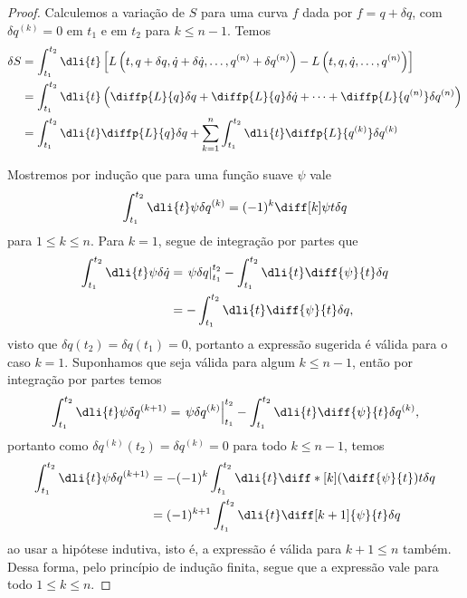 \begin{proof}
    Calculemos a variação de \(S\) para uma curva \(f\) dada por \(f = q + \delta q\), com \(\delta q^{(k)} = 0\) em \(t_1\) e em \(t_2\) para \(k \leq n-1\). Temos
    \begin{align*}
        \delta S &= \int_{t_1}^{t_2} \dli{t} \left[L\left(t, q + \delta q, \dot{q} + \delta \dot{q}, \dots, q^{(n)} + \delta q^{(n)}\right) - L\left(t, q, \dot{q}, \dots, q^{(n)}\right)\right]\\
                 &= \int_{t_1}^{t_2} \dli{t} \left( \diffp{L}{q} \delta q + \diffp{L}{q} \delta \dot{q}  + \dots + \diffp{L}{q^{(n)}}\delta q^{(n)}\right)\\
                 &= \int_{t_1}^{t_2} \dli{t} \diffp{L}{q}\delta q + \sum_{k = 1}^n \int_{t_1}^{t_2}\dli{t} \diffp{L}{q^{(k)}}\delta q^{(k)}
    \end{align*}

    Mostremos por indução que para uma função suave \(\psi\) vale
    \begin{equation*}
        \int_{t_1}^{t_2} \dli{t} \psi \delta q^{(k)} = (-1)^k\diff[k]\psi{t} \delta q
    \end{equation*}
    para \(1 \leq k \leq n\). Para \(k = 1\), segue de integração por partes que
    \begin{align*}
        \int_{t_1}^{t_2} \dli{t} \psi \delta \dot{q} &= \left.\psi\delta q\right\rvert_{t_1}^{t_2} - \int_{t_1}^{t_2} \dli{t}\diff{\psi}{t} \delta q\\
                                                                   &= - \int_{t_1}^{t_2} \dli{t} \diff{\psi}{t}\delta q,
    \end{align*}
    visto que \(\delta q(t_2) = \delta q(t_1) = 0\), portanto a expressão sugerida é válida para o caso \(k = 1\). Suponhamos que seja válida para algum \(k \leq n - 1\), então por integração por partes temos
    \begin{equation*}
        \int_{t_1}^{t_2} \dli{t} \psi \delta q^{({k+1})} = \left.\psi\delta q^{(k)}\right\rvert_{t_1}^{t_2} - \int_{t_1}^{t_2} \dli{t} \diff{\psi}{t} \delta q^{(k)},
    \end{equation*}
    portanto como \(\delta q^{(k)}(t_2) = \delta q^{(k)} = 0\) para todo \(k \leq n-1\), temos
    \begin{align*}
        \int_{t_1}^{t_2} \dli{t} \psi \delta q^{({k+1})} &= - (-1)^{k}\int_{t_1}^{t_2} \dli{t} \diff*[k]{\left(\diff{\psi}{t}\right)}{t}\delta q\\
                                                         &= (-1)^{k+1} \int_{t_1}^{t_2} \dli{t} \diff[k+1]{\psi}{t} \delta q
    \end{align*}
    ao usar a hipótese indutiva, isto é, a expressão é válida para \(k+1 \leq n\) também. Dessa forma, pelo princípio de indução finita, segue que a expressão vale para todo \(1\leq k \leq n\).


\end{proof}
